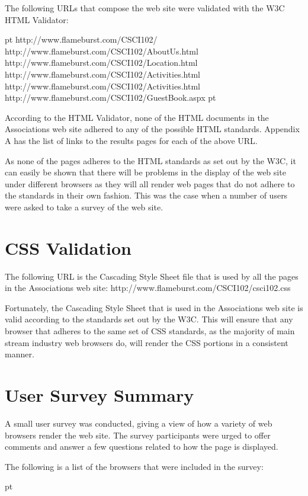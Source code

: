 The following URLs that compose the web site were validated with the W3C HTML
Validator:

 pt
\items http://www.flameburst.com/CSCI102/
\items http://www.flameburst.com/CSCI102/AboutUs.html
\items http://www.flameburst.com/CSCI102/Location.html
\items http://www.flameburst.com/CSCI102/Activities.html
\items http://www.flameburst.com/CSCI102/Activities.html
\items http://www.flameburst.com/CSCI102/GuestBook.aspx
 pt

According to the HTML Validator, none of the HTML documents in the Associations
web site adhered to any of the possible HTML standards. Appendix A has the list
of links to the results pages for each of the above URL.

As none of the pages adheres to the HTML standards as set out by the W3C, it
can easily be shown that there will be problems in the display of the web site
under different browsers as they will all render web pages that do not adhere
to the standards in their own fashion. This was the case when a number of users
were asked to take a survey of the web site.

\section{CSS Validation}

The following URL is the Cascading Style Sheet file that is used by all the
pages in the Associations web site:
http://www.flameburst.com/CSCI102/csci102.css

Fortunately, the Cascading Style Sheet that is used in the Associations web site
is valid according to the standards set out by the W3C. This will ensure that
any browser that adheres to the same set of CSS standards, as the majority of
main stream industry web browsers do, will render the CSS portions in a
consistent manner.

\section{User Survey Summary}

A small user survey was conducted, giving a view of how a variety of web
browsers render the web site. The survey participants were urged to offer
comments and answer a few questions related to how the page is displayed.

The following is a list of the browsers that were included in the survey:

 pt

